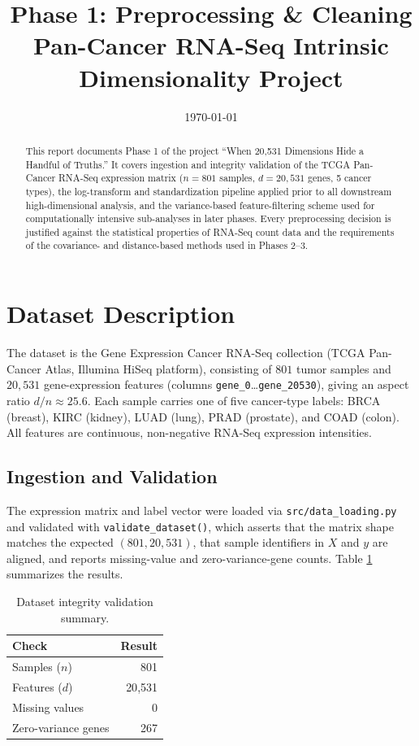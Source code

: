 \documentclass[11pt]{article}
\title{Phase 1: Preprocessing \& Cleaning \\
\large Pan-Cancer RNA-Seq Intrinsic Dimensionality Project}
\author{}
\date{\today}
\begin{document}
\maketitle

\begin{abstract}
This report documents Phase 1 of the project ``When 20,531 Dimensions Hide a
Handful of Truths.'' It covers ingestion and integrity validation of the
TCGA Pan-Cancer RNA-Seq expression matrix ($n=801$ samples,
$d=20{,}531$ genes, 5 cancer types), the log-transform and standardization
pipeline applied prior to all downstream high-dimensional analysis, and the
variance-based feature-filtering scheme used for computationally intensive
sub-analyses in later phases. Every preprocessing decision is justified
against the statistical properties of RNA-Seq count data and the
requirements of the covariance- and distance-based methods used in
Phases 2--3.
\end{abstract}

\section{Dataset Description}

The dataset is the Gene Expression Cancer RNA-Seq collection (TCGA
Pan-Cancer Atlas, Illumina HiSeq platform), consisting of $801$ tumor
samples and $20{,}531$ gene-expression features (columns
\texttt{gene\_0}\ldots\texttt{gene\_20530}), giving an aspect ratio
$d/n \approx 25.6$. Each sample carries one of five cancer-type labels:
BRCA (breast), KIRC (kidney), LUAD (lung), PRAD (prostate), and COAD
(colon). All features are continuous, non-negative RNA-Seq expression
intensities.

\subsection{Ingestion and Validation}

The expression matrix and label vector were loaded via
\texttt{src/data\_loading.py} and validated with
\texttt{validate\_dataset()}, which asserts that the matrix shape matches
the expected $(801, 20{,}531)$, that sample identifiers in $X$ and $y$ are
aligned, and reports missing-value and zero-variance-gene counts. Table
\ref{tab:validation} summarizes the results.

\begin{table}[H]
\centering
\caption{Dataset integrity validation summary.}
\label{tab:validation}
\begin{tabular}{lr}
\toprule
Check & Result \\
\midrule
Samples ($n$) & 801 \\
Features ($d$) & 20{,}531 \\
Missing values & 0 \\
Zero-variance genes & 267 \\
\bottomrule
\end{tabular}
\end{table}
\end{document}

